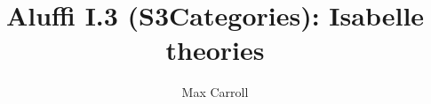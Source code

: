 \documentclass[11pt,a4paper]{article}
\begin{document}
\title{Aluffi I.3 (S3Categories): Isabelle theories}
\author{Max Carroll}
\maketitle


\end{document}

